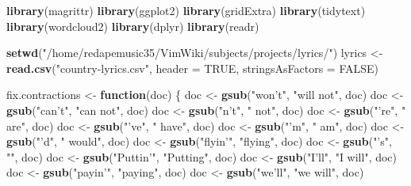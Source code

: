 \documentclass[]{article}
\newenvironment{Shaded}{\begin{snugshade}}{\end{snugshade}}
\newcommand{\ControlFlowTok}[1]{\textcolor[rgb]{0.13,0.29,0.53}{\textbf{#1}}}
\newcommand{\DataTypeTok}[1]{\textcolor[rgb]{0.13,0.29,0.53}{#1}}
\newcommand{\KeywordTok}[1]{\textcolor[rgb]{0.13,0.29,0.53}{\textbf{#1}}}
\newcommand{\NormalTok}[1]{#1}
\newcommand{\OtherTok}[1]{\textcolor[rgb]{0.56,0.35,0.01}{#1}}
\newcommand{\StringTok}[1]{\textcolor[rgb]{0.31,0.60,0.02}{#1}}
\begin{document}
\begin{Shaded}
\begin{Highlighting}[]
\KeywordTok{library}\NormalTok{(magrittr)}
\KeywordTok{library}\NormalTok{(ggplot2)}
\KeywordTok{library}\NormalTok{(gridExtra)}
\KeywordTok{library}\NormalTok{(tidytext)}
\KeywordTok{library}\NormalTok{(wordcloud2)}
\KeywordTok{library}\NormalTok{(dplyr)}
\KeywordTok{library}\NormalTok{(readr)}

\KeywordTok{setwd}\NormalTok{(}\StringTok{"/home/redapemusic35/VimWiki/subjects/projects/lyrics/"}\NormalTok{)}
\NormalTok{lyrics <-}\StringTok{ }\KeywordTok{read.csv}\NormalTok{(}\StringTok{"country-lyrics.csv"}\NormalTok{, }\DataTypeTok{header =} \OtherTok{TRUE}\NormalTok{, }\DataTypeTok{stringsAsFactors =} \OtherTok{FALSE}\NormalTok{)}

\NormalTok{fix.contractions <-}\StringTok{ }\ControlFlowTok{function}\NormalTok{(doc) \{}
\NormalTok{  doc <-}\StringTok{ }\KeywordTok{gsub}\NormalTok{(}\StringTok{"won't"}\NormalTok{, }\StringTok{"will not"}\NormalTok{, doc)}
\NormalTok{  doc <-}\StringTok{ }\KeywordTok{gsub}\NormalTok{(}\StringTok{"can't"}\NormalTok{, }\StringTok{"can not"}\NormalTok{, doc)}
\NormalTok{  doc <-}\StringTok{ }\KeywordTok{gsub}\NormalTok{(}\StringTok{"n't"}\NormalTok{, }\StringTok{" not"}\NormalTok{, doc)}
\NormalTok{  doc <-}\StringTok{ }\KeywordTok{gsub}\NormalTok{(}\StringTok{"'re"}\NormalTok{, }\StringTok{" are"}\NormalTok{, doc)}
\NormalTok{  doc <-}\StringTok{ }\KeywordTok{gsub}\NormalTok{(}\StringTok{"'ve"}\NormalTok{, }\StringTok{" have"}\NormalTok{, doc)}
\NormalTok{  doc <-}\StringTok{ }\KeywordTok{gsub}\NormalTok{(}\StringTok{"'m"}\NormalTok{, }\StringTok{" am"}\NormalTok{, doc)}
\NormalTok{  doc <-}\StringTok{ }\KeywordTok{gsub}\NormalTok{(}\StringTok{"'d"}\NormalTok{, }\StringTok{" would"}\NormalTok{, doc)}
\NormalTok{  doc <-}\StringTok{ }\KeywordTok{gsub}\NormalTok{(}\StringTok{"flyin'"}\NormalTok{, }\StringTok{"flying"}\NormalTok{, doc)}
\NormalTok{  doc <-}\StringTok{ }\KeywordTok{gsub}\NormalTok{(}\StringTok{"'s"}\NormalTok{, }\StringTok{""}\NormalTok{, doc)}
\NormalTok{  doc <-}\StringTok{ }\KeywordTok{gsub}\NormalTok{(}\StringTok{"Puttin'"}\NormalTok{, }\StringTok{"Putting"}\NormalTok{, doc)}
\NormalTok{  doc <-}\StringTok{ }\KeywordTok{gsub}\NormalTok{(}\StringTok{"I'll"}\NormalTok{, }\StringTok{"I will"}\NormalTok{, doc)}
\NormalTok{  doc <-}\StringTok{ }\KeywordTok{gsub}\NormalTok{(}\StringTok{"payin'"}\NormalTok{, }\StringTok{"paying"}\NormalTok{, doc)}
\NormalTok{  doc <-}\StringTok{ }\KeywordTok{gsub}\NormalTok{(}\StringTok{"we'll"}\NormalTok{, }\StringTok{"we will"}\NormalTok{, doc)}

\end{Highlighting}
\end{Shaded}
\end{document}
